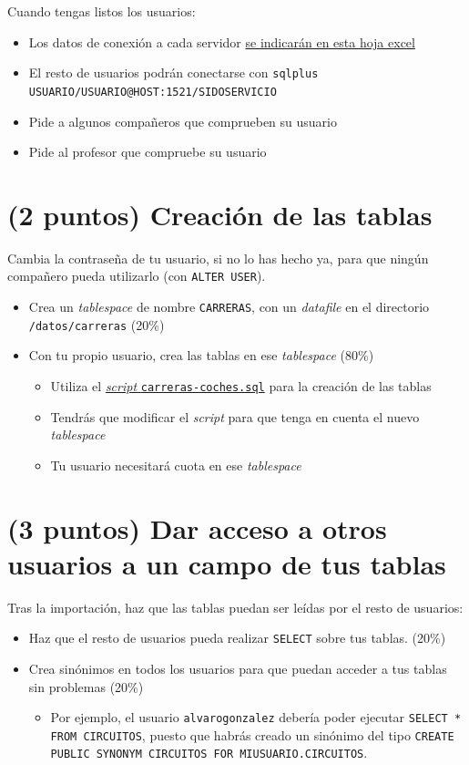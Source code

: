 \documentclass[a4paper]{article}
\begin{document}
Cuando tengas listos los usuarios:
\begin{itemize}
\item Los datos de conexión a cada servidor \href{https://docs.google.com/spreadsheets/d/17A6TpGOixGVVZr1VlocN6ZhMuKqmQjD3XedyIne4ows/edit\#gid=0}{se indicarán en esta hoja excel}
\item El resto de usuarios podrán conectarse con \texttt{sqlplus USUARIO/USUARIO@HOST:1521/SIDOSERVICIO}
\item Pide a algunos compañeros que comprueben su usuario
\item Pide al profesor que compruebe su usuario
\end{itemize}
\section{(2 puntos) Creación de las tablas}
\label{sec:org0000009}
Cambia la contraseña de tu usuario, si no lo has hecho ya, para que ningún compañero pueda utilizarlo (con \texttt{ALTER USER}).

\begin{itemize}
\item Crea un \emph{tablespace} de nombre \texttt{CARRERAS}, con un \emph{datafile} en el directorio \texttt{/datos/carreras} (20\%)
\item Con tu propio usuario, crea las tablas en ese \emph{tablespace} (80\%)
\begin{itemize}
\item Utiliza el \href{https://raw.githubusercontent.com/alvarogonzalezsotillo/apuntes-clase/gh-pages/sistemas-gestores-bbdd-asir2/apuntes/1/sql/carreras-coches.sql}{\emph{script} \texttt{carreras-coches.sql}} para la creación de las tablas
\item Tendrás que modificar el \emph{script} para que tenga en cuenta el nuevo \emph{tablespace}
\item Tu usuario necesitará cuota en ese \emph{tablespace}
\end{itemize}
\end{itemize}
\section{(3 puntos) Dar acceso a otros usuarios a un campo de tus tablas}
\label{sec:org000000c}
Tras la importación, haz que las tablas puedan ser leídas por el resto de usuarios:
\begin{itemize}
\item Haz que el resto de usuarios pueda realizar \texttt{SELECT} sobre tus tablas. (20\%)
\item Crea sinónimos en todos los usuarios para que puedan acceder a tus tablas sin problemas (20\%)
\begin{itemize}
\item Por ejemplo, el usuario \texttt{alvarogonzalez} debería poder ejecutar \texttt{SELECT * FROM CIRCUITOS}, puesto que habrás creado un sinónimo del tipo \texttt{CREATE PUBLIC SYNONYM CIRCUITOS FOR MIUSUARIO.CIRCUITOS}.
\end{itemize}
\end{itemize}
\end{document}
